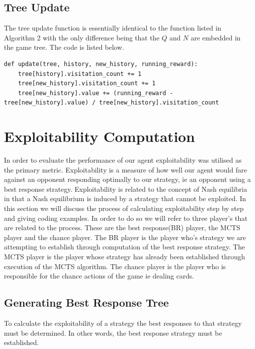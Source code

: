 \subsection{Tree Update}\label{subsec:treeUpdate}
The tree update function is essentially identical to the function listed in Algorithm 2 with
the only difference being that the $Q$ and $N$ are embedded in the game tree.
The code is listed below.

\begin{lstlisting}[style=Python]
    def update(tree, history, new_history, running_reward):
    tree[history].visitation_count += 1
    tree[new_history].visitation_count += 1
    tree[new_history].value += (running_reward - tree[new_history].value) / tree[new_history].visitation_count
\end{lstlisting}


\section{Exploitability Computation}\label{sec:bestResponseComputation}
In order to evaluate the performance of our agent exploitability was utilised as the primary metric.
Exploitability is a measure of how well our agent would fare against an opponent responding
optimally to our strategy, ie an opponent using a best response strategy.
Exploitability is related to the concept of Nash equilibria in that a Nash equilibrium
is induced by a strategy that cannot be exploited.
In this section we will discuss the process of calculating exploitability step by step and giving coding examples.
In order to do so we will refer to three player's that are related to the process.
These are the best response(BR) player, the MCTS player and the chance player.
The BR player is the player who's strategy we are attempting to establish through computation
of the best response strategy.
The MCTS player is the player whose strategy has already been established through execution of the MCTS algorithm.
The chance player is the player who is responsible for the chance actions of the game ie dealing cards.

\subsection{Generating Best Response Tree}\label{subsec:applyMCTS}
To calculate the exploitability of a strategy the best responses to that strategy must be
determined.
In other words, the best response strategy must be established.

